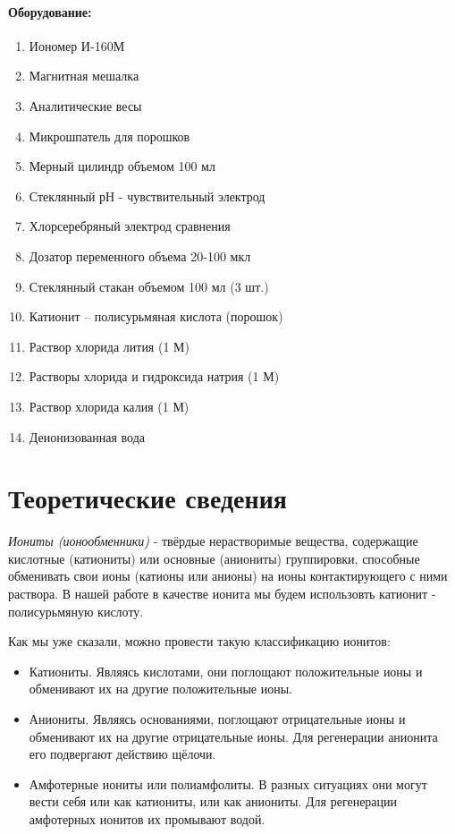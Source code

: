 \documentclass[a4paper,12pt]{article} %
\begin{document}
\paragraph{Оборудование:}
\begin{enumerate}
    \item Иономер И-160М
  \item Магнитная мешалка
 \item Аналитические весы
  \item Микрошпатель для порошков
  \item Мерный цилиндр объемом 100 мл
 \item  Стеклянный рН - чувствительный электрод
  \item Хлорсеребряный электрод сравнения
  \item Дозатор переменного объема 20-100 мкл
  \item Стеклянный стакан объемом 100 мл (3 шт.)
  \item Катионит – полисурьмяная кислота (порошок)
  \item Раствор хлорида лития (1 М)
  \item Растворы хлорида и гидроксида натрия (1 М)
  \item Раствор хлорида калия (1 М)
  \item Деионизованная вода
\end{enumerate}

\section{Теоретические сведения}
\textit{Иониты (ионообменники)} - твёрдые нерастворимые вещества, содержащие кислотные (катиониты) или основные (аниониты) группировки, способные обменивать свои ионы (катионы или анионы) на ионы контактирующего с ними раствора. В нашей работе в качестве ионита мы будем использовть катионит - полисурьмяную кислоту.

Как мы уже сказали, можно провести такую классификацию ионитов:

\begin{itemize}
    \item Катиониты. Являясь кислотами, они поглощают положительные ионы и обменивают их на другие положительные ионы.
    \item Аниониты. Являясь основаниями, поглощают отрицательные ионы и обменивают их на другие отрицательные ионы. Для регенерации анионита его подвергают действию щёлочи.
    \item Амфотерные иониты или полиамфолиты. В разных ситуациях они могут вести себя или как катиониты, или как аниониты. Для регенерации амфотерных ионитов их промывают водой.
\end{itemize}
\end{document}
